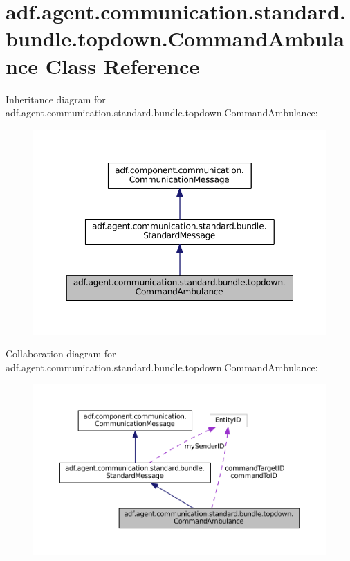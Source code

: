 \hypertarget{classadf_1_1agent_1_1communication_1_1standard_1_1bundle_1_1topdown_1_1CommandAmbulance}{}\section{adf.\+agent.\+communication.\+standard.\+bundle.\+topdown.\+Command\+Ambulance Class Reference}
\label{classadf_1_1agent_1_1communication_1_1standard_1_1bundle_1_1topdown_1_1CommandAmbulance}


Inheritance diagram for adf.\+agent.\+communication.\+standard.\+bundle.\+topdown.\+Command\+Ambulance\+:
\nopagebreak
\begin{figure}[H]
\begin{center}
\leavevmode
\includegraphics[width=350pt]{classadf_1_1agent_1_1communication_1_1standard_1_1bundle_1_1topdown_1_1CommandAmbulance__inherit__graph}
\end{center}
\end{figure}


Collaboration diagram for adf.\+agent.\+communication.\+standard.\+bundle.\+topdown.\+Command\+Ambulance\+:
\nopagebreak
\begin{figure}[H]
\begin{center}
\leavevmode
\includegraphics[width=350pt]{classadf_1_1agent_1_1communication_1_1standard_1_1bundle_1_1topdown_1_1CommandAmbulance__coll__graph}
\end{center}
\end{figure}
